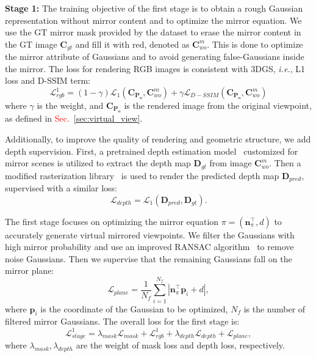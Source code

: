 \documentclass[conference]{IEEEtran}
\begin{document}
\textbf{Stage 1:} The training objective of the first stage is to obtain a rough Gaussian representation without mirror content and to optimize the mirror equation. We use the GT mirror mask provided by the dataset to erase the mirror content in the GT image  $\mathbf{C}_{gt}$ and fill it with red, denoted as $\mathbf{C}_{wo}^{m}$. This is done to optimize the mirror attribute of Gaussians and to avoid generating false-Gaussians inside the mirror. The loss for rendering RGB images is consistent with 3DGS\cite{3dgs}, \textit{i.e.}, L1 loss and D-SSIM term: 
\begin{equation}
    \mathcal{L}_{rgb}^1 = (1 \! - \! \gamma ) \mathcal{L}_1(\mathbf{C}_{\mathbf{P_o}}, \mathbf{C}_{wo}^{m})  +  \gamma\mathcal{L}_{D-SSIM}(\mathbf{C}_{\mathbf{P_o}}, \mathbf{C}_{wo}^{m})
\end{equation}
where $\gamma$ is the weight, and $\mathbf{C}_{\mathbf{P_o}}$ is the rendered image from the original viewpoint, as defined in \textcolor{red}{Sec.~\ref{sec:virtual_view}}. 


Additionally, to improve the quality of rendering and geometric structure, we add depth supervision. First, a pretrained depth estimation model~\cite{costanzino2023learning} customized for mirror scenes is utilized to extract the depth map $\mathbf{D}_{gt}$ from image $\mathbf{C}_{wo}^{m}$.  Then a modified rasterization library~\cite{luiten2024dynamic} is used to render the predicted depth map $\mathbf{D}_{pred}$,  supervised with a similar loss: 
\begin{equation}
\label{eq:depth}
    \mathcal{L}_{depth} = \mathcal{L}_1(\mathbf{D}_{pred}, \mathbf{D}_{gt}) .
\end{equation}

The first stage focuses on optimizing the mirror equation $\pi = (\boldsymbol{n}_{\pi}^\top, d)$ to accurately generate virtual mirrored viewpoints. We filter the Gaussians with high mirror probability and use an improved RANSAC algorithm~\cite{fischler1981random} to remove noise Gaussians. Then we supervise that the remaining Gaussians fall on the mirror plane: 
\begin{equation}
    \mathcal{L}_{plane}=\frac{1}{N_f} \sum_{i=1}^{N_f}\left| \boldsymbol{n}_{\pi}^\top  \boldsymbol{p}_i + d \right|,
\end{equation}
where $\boldsymbol{p}_i$ is the coordinate of the Gaussian to be optimized, $N_f$ is the number of filtered mirror Gaussians. The overall loss for the first stage is: 
\begin{equation}
    \mathcal{L}_{stage}^{1} = \lambda_{mask}\mathcal{L}_{mask} + \mathcal{L}_{rgb}^{1} + \lambda_{depth}\mathcal{L}_{depth} + \mathcal{L}_{plane},
\end{equation}
where $\lambda_{mask}, \lambda_{depth}$ are the weight of mask loss and depth loss, respectively.
\end{document}
